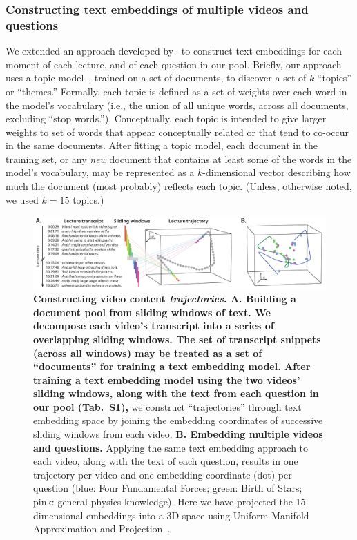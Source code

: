 \documentclass[10pt]{article}
\newcommand{\questions}{S1}
\begin{document}
\subsubsection*{Constructing text embeddings of multiple videos and questions}

We extended an approach developed by~\citep{HeusEtal21} to construct text
embeddings for each moment of each lecture, and of each question in our pool.
Briefly, our approach uses a topic model~\citep{BleiEtal03}, trained on a set
of documents, to discover a set of $k$ ``topics'' or ``themes.'' Formally, each
topic is defined as a set of weights over each word in the model's vocabulary
(i.e., the union of all unique words, across all documents, excluding ``stop
words.''). Conceptually, each topic is intended to give larger weights to set
of words that appear conceptually related or that tend to co-occur in the same
documents. After fitting a topic model, each document in the training set, or
any \textit{new} document that contains at least some of the words in the
model's vocabulary, may be represented as a $k$-dimensional vector describing
how much the document (most probably) reflects each topic. (Unless, otherwise
noted, we used $k = 15$ topics.)

\begin{figure}[tp]
\centering
\includegraphics[width=\textwidth]{figs/sliding_windows}

\caption{\textbf{Constructing video content \textit{trajectories}. \textbf{A.
Building a document pool from sliding windows of text.} We decompose each
video's transcript into a series of overlapping sliding windows. The set of
transcript snippets (across all windows) may be treated as a set of
``documents'' for training a text embedding model. After training a text
embedding model using the two videos' sliding windows, along with the text from
each question in our pool (Tab.~\questions), } we construct ``trajectories''
through text embedding space by joining the embedding coordinates of successive
sliding windows from each video. \textbf{B. Embedding multiple videos and
questions.} Applying the same text embedding approach to each video, along with
the text of each question, results in one trajectory per video and one
embedding coordinate (dot) per question (blue: Four Fundamental Forces; green:
Birth of Stars; pink: general physics knowledge). Here we have projected the
15-dimensional embeddings into a 3D space using Uniform Manifold Approximation
and Projection~\citep[UMAP;][]{McInEtal18a}.}

\label{fig:sliding-windows}
\end{figure}
\end{document}
